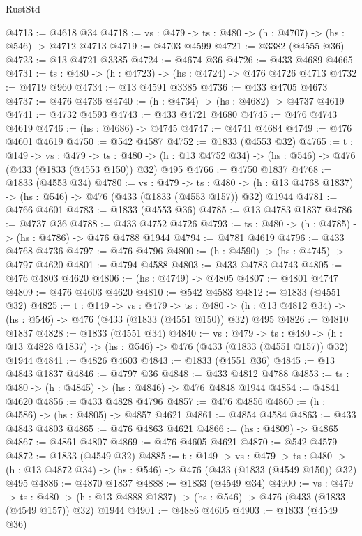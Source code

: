 \begin{lexlean}{RustStd}
\begin{coremodule}
@4713 := @4618 @34
@4718 := {vs : @479} -> {ts : @480} -> (h : @4707) -> (hs : @546) -> @4712 @4713
@4719 := @4703 @4599
@4721 := @3382 (@4555 @36)
@4723 := @13 @4721 @3385
@4724 := @4674 @36
@4726 := @433 @4689 @4665
@4731 := {ts : @480} -> (h : @4723) -> (hs : @4724) -> @476 @4726 @4713
@4732 := @4719 @960
@4734 := @13 @4591 @3385
@4736 := @433 @4705 @4673
@4737 := @476 @4736
@4740 := (h : @4734) -> (hs : @4682) -> @4737 @4619
@4741 := @4732 @4593
@4743 := @433 @4721 @4680
@4745 := @476 @4743 @4619
@4746 := (hs : @4686) -> @4745
@4747 := @4741 @4684
@4749 := @476 @4601 @4619
@4750 := @542 @4587
@4752 := @1833 (@4553 @32)
@4765 := {t : @149} ->
  {vs : @479} ->
  {ts : @480} -> (h : @13 @4752 @34) -> (hs : @546) -> @476 (@433 (@1833 (@4553 @150)) @32) @495
@4766 := @4750 @1837
@4768 := @1833 (@4553 @34)
@4780 := {vs : @479} ->
  {ts : @480} -> (h : @13 @4768 @1837) -> (hs : @546) -> @476 (@433 (@1833 (@4553 @157)) @32) @1944
@4781 := @4766 @4601
@4783 := @1833 (@4553 @36)
@4785 := @13 @4783 @1837
@4786 := @4737 @36
@4788 := @433 @4752 @4726
@4793 := {ts : @480} -> (h : @4785) -> (hs : @4786) -> @476 @4788 @1944
@4794 := @4781 @4619
@4796 := @433 @4768 @4736
@4797 := @476 @4796
@4800 := (h : @4590) -> (hs : @4745) -> @4797 @4620
@4801 := @4794 @4588
@4803 := @433 @4783 @4743
@4805 := @476 @4803 @4620
@4806 := (hs : @4749) -> @4805
@4807 := @4801 @4747
@4809 := @476 @4603 @4620
@4810 := @542 @4583
@4812 := @1833 (@4551 @32)
@4825 := {t : @149} ->
  {vs : @479} ->
  {ts : @480} -> (h : @13 @4812 @34) -> (hs : @546) -> @476 (@433 (@1833 (@4551 @150)) @32) @495
@4826 := @4810 @1837
@4828 := @1833 (@4551 @34)
@4840 := {vs : @479} ->
  {ts : @480} -> (h : @13 @4828 @1837) -> (hs : @546) -> @476 (@433 (@1833 (@4551 @157)) @32) @1944
@4841 := @4826 @4603
@4843 := @1833 (@4551 @36)
@4845 := @13 @4843 @1837
@4846 := @4797 @36
@4848 := @433 @4812 @4788
@4853 := {ts : @480} -> (h : @4845) -> (hs : @4846) -> @476 @4848 @1944
@4854 := @4841 @4620
@4856 := @433 @4828 @4796
@4857 := @476 @4856
@4860 := (h : @4586) -> (hs : @4805) -> @4857 @4621
@4861 := @4854 @4584
@4863 := @433 @4843 @4803
@4865 := @476 @4863 @4621
@4866 := (hs : @4809) -> @4865
@4867 := @4861 @4807
@4869 := @476 @4605 @4621
@4870 := @542 @4579
@4872 := @1833 (@4549 @32)
@4885 := {t : @149} ->
  {vs : @479} ->
  {ts : @480} -> (h : @13 @4872 @34) -> (hs : @546) -> @476 (@433 (@1833 (@4549 @150)) @32) @495
@4886 := @4870 @1837
@4888 := @1833 (@4549 @34)
@4900 := {vs : @479} ->
  {ts : @480} -> (h : @13 @4888 @1837) -> (hs : @546) -> @476 (@433 (@1833 (@4549 @157)) @32) @1944
@4901 := @4886 @4605
@4903 := @1833 (@4549 @36)

\end{coremodule}
\end{lexlean}

